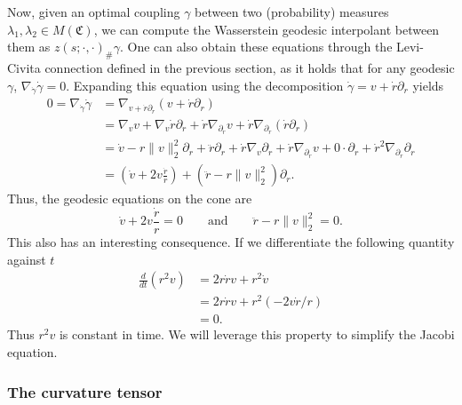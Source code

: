 \documentclass{article}
\begin{document}
Now, given an optimal coupling $\gamma$ between two (probability) measures $\lambda_1, \lambda_2 \in M(\mathfrak{C})$, we can compute the Wasserstein geodesic interpolant between them as $z(s; \cdot, \cdot)_{\#}\gamma$. One can also obtain these equations through the Levi-Civita connection defined in the previous section, as it holds that for any geodesic $\gamma$, $\nabla_{\dot \gamma}\dot \gamma = 0$. Expanding this equation using the decomposition $\dot \gamma = v + \dot r\partial_r$  yields
\begin{align}
    0 = \nabla_{\dot \gamma}\dot \gamma &= \nabla_{v + \dot r \partial_r}(v + \dot r\partial_r) \\
    &= \nabla_vv + \nabla_v \dot r \partial_r + \dot r \nabla_{\partial_r}v + \dot r \nabla_{\partial_r}(\dot r \partial_r) \\
    &= \dot v - r\|v\|_2^2\partial_r + \ddot r \partial_r + \dot r \nabla_v\partial_r + \dot r \nabla_{\partial_r}v + 0\cdot  \partial_r + \dot r^2 \nabla_{\partial_r}\partial_r \\
    &= \left(\dot v + 2v\frac{\dot r}{r}\right) + \left(\ddot r  - r\|v\|_2^2\right)\partial_r.
\end{align}
Thus, the geodesic equations on the cone are
\begin{equation}\label{eq: geodesic equations on the cone}
    \dot v + 2v\frac{\dot r}{r} = 0 \qquad \text{and} \qquad \ddot r  - r\|v\|_2^2 = 0.
\end{equation}
This also has an interesting consequence. If we differentiate the following quantity against $t$
\begin{align*}
    \frac{d}{dt}(r^2v) &= 2r\dot rv + r^2 \dot v \\
    &= 2r \dot r v + r^2(-2v\dot r/r) \\
    &= 0.
\end{align*}
Thus $r^2v$ is constant in time. We will leverage this property to simplify the Jacobi equation. 

\subsubsection{The curvature tensor}
\end{document}
